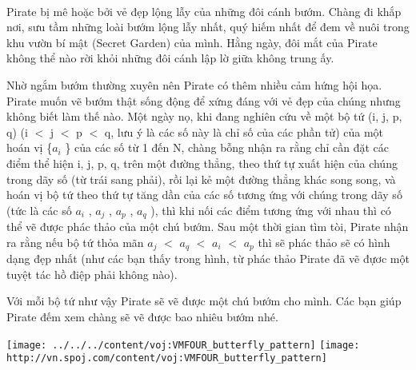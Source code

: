  

Pirate bị mê hoặc bởi vẻ đẹp lộng lẫy của những đôi cánh bướm. Chàng đi khắp nơi, sưu tầm những loài bướm lộng lẫy nhất, quý hiếm nhất để đem về nuôi trong khu vườn bí mật (Secret Garden) của mình. Hằng ngày, đôi mắt của Pirate không thể nào rời khỏi những đôi cánh lập lờ giữa không trung ấy.

Nhờ ngắm bướm thường xuyên nên Pirate có thêm nhiều cảm hứng hội họa. Pirate muốn vẽ bướm thật sống động để xứng đáng với vẻ đẹp của chúng nhưng không biết làm thế nào. Một ngày nọ, khi đang nghiên cứu về một bộ tứ (i, j, p, q) (i $<$ j $<$ p $<$ q, lưu ý là các số này là chỉ số của các phần tử) của một hoán vị \{$a_{i}$ \} của các số từ 1 đến N, chàng bỗng nhận ra rằng chỉ cần đặt các điểm thể hiện i, j, p, q, trên một đường thẳng, theo thứ tự xuất hiện của chúng trong dãy số (từ trái sang phải), rồi lại kẻ một đường thẳng khác song song, và hoán vị bộ tứ theo thứ tự tăng dần của các số tương ứng với chúng trong dãy số (tức là các số $a_{i}$ , $a_{j}$ , $a_{p}$ , $a_{q}$ ), thì khi nối các điểm tương ứng với nhau thì có thể vẽ được phác thảo của một chú bướm. Sau một thời gian tìm tòi, Pirate nhận ra rằng nếu bộ tứ thỏa mãn $a_{j}$ $<$ $a_{q}$ $<$ $a_{i}$ $<$ $a_{p}$ thì sẽ phác thảo sẽ có hình dạng đẹp nhất (như các bạn thấy trong hình, từ phác thảo Pirate đã vẽ đựơc một tuyệt tác hồ điệp phải không nào).

Với mỗi bộ tứ như vậy Pirate sẽ vẽ được một chú bướm cho mình. Các bạn giúp Pirate đếm xem chàng sẽ vẽ được bao nhiêu bướm nhé.


\texttt{[image: ../../../content/voj:VMFOUR\_butterfly\_pattern]}
\texttt{[image: http://vn.spoj.com/content/voj:VMFOUR\_butterfly\_pattern]}
\begin{itemize}
\end{itemize}

 